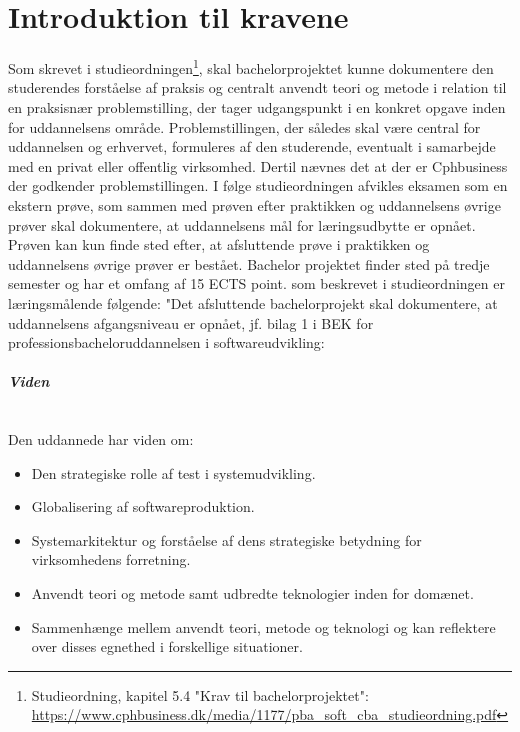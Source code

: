 \documentclass[class=report, crop=false]{standalone}
\begin{document}
    \section{Introduktion til kravene}
    Som skrevet i studieordningen\footnote{Studieordning, kapitel 5.4 "Krav til bachelorprojektet": \url{https://www.cphbusiness.dk/media/1177/pba_soft_cba_studieordning.pdf}}, 
    skal bachelorprojektet kunne dokumentere den studerendes forståelse af praksis og centralt
    anvendt teori og metode i relation til en praksisnær problemstilling, der tager udgangspunkt i en konkret 
    opgave inden for uddannelsens område. Problemstillingen, der således skal være central for 
    uddannelsen og erhvervet, formuleres af den studerende, eventualt i samarbejde med en privat eller offentlig virksomhed.
    Dertil nævnes det at der er Cphbusiness der godkender problemstillingen. I følge studieordningen afvikles 
    eksamen som en ekstern prøve, som sammen med prøven efter praktikken og uddannelsens øvrige prøver skal dokumentere, 
    at uddannelsens mål for læringsudbytte er opnået. Prøven kan kun finde sted efter, at afsluttende prøve i 
    praktikken og uddannelsens øvrige prøver er bestået.
    Bachelor projektet finder sted på tredje semester og har et omfang af 15 ECTS point.
    som beskrevet i studieordningen er læringsmålende følgende:
    "Det afsluttende bachelorprojekt skal dokumentere, at uddannelsens
    afgangsniveau er opnået, jf. bilag 1 i BEK for professionsbacheloruddannelsen i softwareudvikling:

    \paragraph{\textit{Viden}}\mbox{}\\
    Den uddannede har viden om:
    \begin{itemize}%
        \item Den strategiske rolle af test i systemudvikling.
        \item Globalisering af softwareproduktion.
        \item Systemarkitektur og forståelse af dens strategiske betydning for virksomhedens forretning.
        \item Anvendt teori og metode samt udbredte teknologier inden for domænet.
        \item Sammenhænge mellem anvendt teori, metode og teknologi og kan reflektere over disses egnethed i forskellige situationer.
    \end{itemize}
\end{document}
